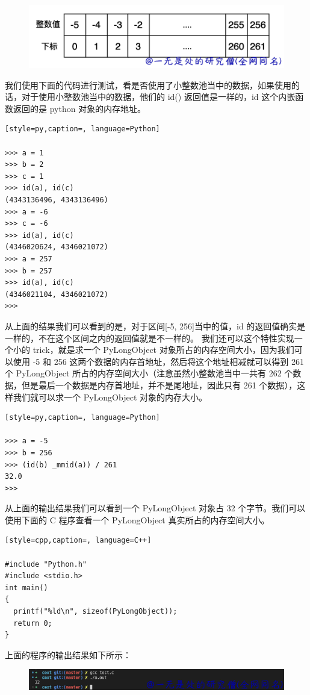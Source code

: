     \begin{figure}[h]
        \centering
            \includegraphics[scale=.3]{images/20-int.png}
            \caption{ }
        \label{fig:my_label}
    \end{figure}
    
我们使用下面的代码进行测试，看是否使用了小整数池当中的数据，如果使用的话，对于使用小整数池当中的数据，他们的 id() 返回值是一样的，id 这个内嵌函数返回的是 python 对象的内存地址。
\begin{lstlisting}[style=py,caption=, language=Python]

>>> a = 1
>>> b = 2
>>> c = 1
>>> id(a), id(c)
(4343136496, 4343136496)
>>> a = -6
>>> c = -6
>>> id(a), id(c)
(4346020624, 4346021072)
>>> a = 257
>>> b = 257
>>> id(a), id(c)
(4346021104, 4346021072)
>>>
\end{lstlisting}
从上面的结果我们可以看到的是，对于区间[-5, 256]当中的值，id 的返回值确实是一样的，不在这个区间之内的返回值就是不一样的。
我们还可以这个特性实现一个小的 trick，就是求一个 PyLongObject 对象所占的内存空间大小，因为我们可以使用 -5 和 256 这两个数据的内存首地址，然后将这个地址相减就可以得到 261 个 PyLongObject 所占的内存空间大小（注意虽然小整数池当中一共有 262 个数据，但是最后一个数据是内存首地址，并不是尾地址，因此只有 261 个数据），这样我们就可以求一个 PyLongObject 对象的内存大小。
\begin{lstlisting}[style=py,caption=, language=Python]

>>> a = -5
>>> b = 256
>>> (id(b) _mmid(a)) / 261 
32.0
>>>
\end{lstlisting}
从上面的输出结果我们可以看到一个 PyLongObject 对象占 32 个字节。我们可以使用下面的 C 程序查看一个 PyLongObject 真实所占的内存空间大小。
\begin{lstlisting}[style=cpp,caption=, language=C++]

#include "Python.h"
#include <stdio.h>
int main()
{
  printf("%ld\n", sizeof(PyLongObject));
  return 0;
}
\end{lstlisting}
上面的程序的输出结果如下所示：

    \begin{figure}[h]
        \centering
            \includegraphics[scale=.2]{images/21-int.png}
            \caption{ }
        \label{fig:my_label}
    \end{figure}
    
